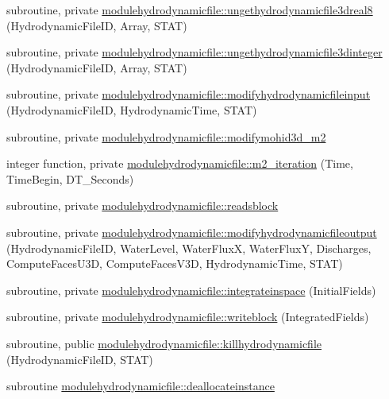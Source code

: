 \begin{DoxyCompactItemize}
\item 
subroutine, private \mbox{\hyperlink{namespacemodulehydrodynamicfile_ac34af87bc19882352d63287997429ba6}{modulehydrodynamicfile\+::ungethydrodynamicfile3dreal8}} (Hydrodynamic\+File\+ID, Array, S\+T\+AT)
\item 
subroutine, private \mbox{\hyperlink{namespacemodulehydrodynamicfile_ac5cff7872d6994174eb551c203e0e56a}{modulehydrodynamicfile\+::ungethydrodynamicfile3dinteger}} (Hydrodynamic\+File\+ID, Array, S\+T\+AT)
\item 
subroutine, private \mbox{\hyperlink{namespacemodulehydrodynamicfile_a78cdd03605613d9ae76372179d4bb493}{modulehydrodynamicfile\+::modifyhydrodynamicfileinput}} (Hydrodynamic\+File\+ID, Hydrodynamic\+Time, S\+T\+AT)
\item 
subroutine, private \mbox{\hyperlink{namespacemodulehydrodynamicfile_aa54587d42d6b13c11895a1f934511d94}{modulehydrodynamicfile\+::modifymohid3d\+\_\+m2}}
\item 
integer function, private \mbox{\hyperlink{namespacemodulehydrodynamicfile_a5a3a54142c84c39924e24d98da9014ae}{modulehydrodynamicfile\+::m2\+\_\+iteration}} (Time, Time\+Begin, D\+T\+\_\+\+Seconds)
\item 
subroutine, private \mbox{\hyperlink{namespacemodulehydrodynamicfile_a51ac7b78492e92f6633e4889f1a47052}{modulehydrodynamicfile\+::readsblock}}
\item 
subroutine, private \mbox{\hyperlink{namespacemodulehydrodynamicfile_ab3996472f919cd0d5d57190aa0fca63e}{modulehydrodynamicfile\+::modifyhydrodynamicfileoutput}} (Hydrodynamic\+File\+ID, Water\+Level, Water\+FluxX, Water\+FluxY, Discharges, Compute\+Faces\+U3D, Compute\+Faces\+V3D, Hydrodynamic\+Time, S\+T\+AT)
\item 
subroutine, private \mbox{\hyperlink{namespacemodulehydrodynamicfile_a567935da3a6ce143ef24e8bb5f4787ea}{modulehydrodynamicfile\+::integrateinspace}} (Initial\+Fields)
\item 
subroutine, private \mbox{\hyperlink{namespacemodulehydrodynamicfile_a3dc8b494b31e0a9504668b6e7dc8eaa6}{modulehydrodynamicfile\+::writeblock}} (Integrated\+Fields)
\item 
subroutine, public \mbox{\hyperlink{namespacemodulehydrodynamicfile_a88c5ccf3cef06396cacc97101de6b5ab}{modulehydrodynamicfile\+::killhydrodynamicfile}} (Hydrodynamic\+File\+ID, S\+T\+AT)
\item 
subroutine \mbox{\hyperlink{namespacemodulehydrodynamicfile_a66415f6a8626e085fe6327e56b6e0438}{modulehydrodynamicfile\+::deallocateinstance}}

\end{DoxyCompactItemize}
